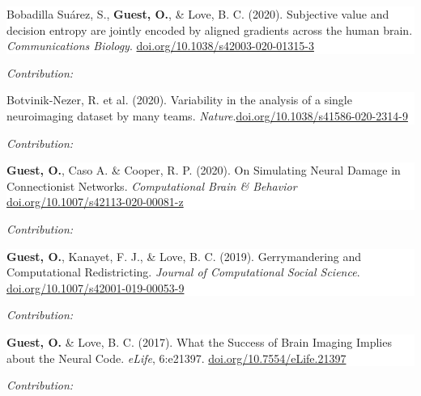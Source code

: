 \documentclass[10pt]{article}
\newcommand{\paper}[2]{\colorbox{white}{\begin{minipage}{\dimexpr\linewidth-2\fboxsep}#1
\end{minipage}}
\if\relax\detokenize{#2}\relax
    \vspace{2pt}
    \else
    \begin{flushright}
    \begin{minipage}{0.99\dimexpr\linewidth-2\fboxsep}\small
    \emph{Contribution:} #2
    \end{minipage}
    \end{flushright}
\fi
}
\begin{document}
\paper{
Bobadilla Suárez, S., \textbf{Guest, O.}, \& Love, B. C. (2020).  {Subjective value and decision entropy are jointly encoded by aligned gradients across the human brain}. \textit{Communications Biology}.
\newline
\href{https://doi.org/10.1038/s42003-020-01315-3}{doi.org/10.1038/s42003-020-01315-3}
}
{}



\paper{Botvinik-Nezer, R. et al. (2020). {Variability in the analysis of a single neuroimaging dataset by many teams}. \textit{Nature}.\newline \href{https://doi.org/10.1038/s41586-020-2314-9}{doi.org/10.1038/s41586-020-2314-9}}
{}

\paper{
\textbf{Guest, O.}, Caso A. \& Cooper, R. P. (2020).  {On Simulating Neural Damage in Connectionist Networks}. \textit{Computational Brain \& Behavior} \newline
 \href{https://doi.org/10.1007/s42113-020-00081-z}{doi.org/10.1007/s42113-020-00081-z}}
 {}

\paper{\textbf{Guest, O.}, Kanayet, F. J., \& Love, B. C. (2019). {Gerrymandering and Computational Redistricting}. \textit{Journal of Computational Social Science}. \newline
\href{https://dx.doi.org/10.1007/s42001-019-00053-9}{doi.org/10.1007/s42001-019-00053-9}}
{}


\paper{
\textbf{Guest, O.} \& Love, B. C. (2017). {What the Success of Brain Imaging Implies about the Neural Code}. \textit{eLife}, 6:e21397. \newline
\href{http://dx.doi.org/10.7554/eLife.21397}{doi.org/10.7554/eLife.21397}
}{}
\end{document}
